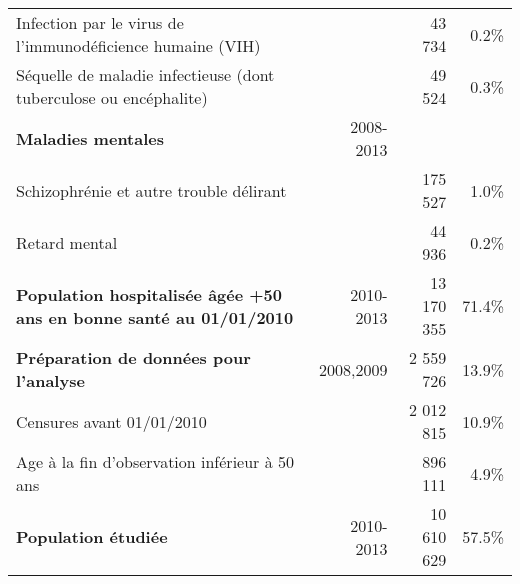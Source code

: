 \begin{tabular}{p{}rrr}
Infection par le virus de l'immunodéficience humaine (VIH) &  & 43 734 & 0.2\% \\ 
Séquelle de maladie infectieuse (dont tuberculose ou encéphalite) &  & 49 524 & 0.3\% \\ 
\textbf{Maladies mentales} & 2008-2013 &  &  \\ 
Schizophrénie et autre trouble délirant &  & 175 527 & 1.0\% \\ 
Retard mental &  & 44 936 & 0.2\% \\ 
\textbf{Population hospitalisée âgée +50 ans en bonne santé au 01/01/2010} & 2010-2013 & 13 170 355 & 71.4\% \\ 
\textbf{Préparation de données pour l'analyse} & 2008,2009 & 2 559 726 & 13.9\% \\ 
Censures avant 01/01/2010 &  & 2 012 815 & 10.9\% \\ 
Age à la fin d'observation inférieur à 50 ans &  & 896 111 & 4.9\% \\ 
\textbf{Population étudiée} & 2010-2013 & 10 610 629 & 57.5\% \\ 
\bottomrule
\end{tabular}

